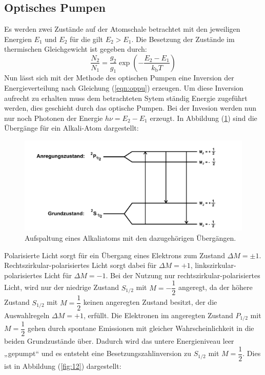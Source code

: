\subsection{Optisches Pumpen}
\label{sec:op}
Es werden zwei Zustände auf der Atomschale betrachtet mit den jeweiligen Energien $E_\mathrm{1}$ und $E_\mathrm{2}$ für die gilt $E_\mathrm{2}>E_\mathrm{1}$. Die Besetzung der Zustände im thermischen Gleichgewicht ist gegeben durch:
\begin{equation}
  \label{eqn:oppu}
  \dfrac{N_\mathrm{2}}{N_\mathrm{1}}=\dfrac{g_\mathrm{2}}{g_\mathrm{1}}\exp(-\dfrac{E_\mathrm{2}-E_\mathrm{1}}{k_\mathrm{b}T})
\end{equation}
Nun lässt sich mit der Methode des optischen Pumpen eine Inversion der Energieverteilung nach Gleichung (\ref{eqn:oppu}) erzeugen. Um diese Inversion aufrecht zu erhalten muss dem betrachteten Sytem ständig Energie zugeführt werden, dies geschieht durch das optische Pumpen. Bei der Invesion werden nun nur noch Photonen der Energie $h\nu=E_\mathrm{2}-E_\mathrm{1}$ erzeugt.
In Abbildung (\ref{fig:niveaus}) sind die Übergänge für ein Alkali-Atom dargestellt:
\begin{figure}[h!]
  \centering
  \includegraphics[scale=0.5]{fig/niveaus.png}
  \caption{Aufspaltung eines Alkaliatoms mit den dazugehörigen Übergängen.}
  \label{fig:niveaus}
\end{figure}
Polarisierte Licht sorgt für ein Übergang eines Elektrons zum Zustand $\Delta M=\pm 1$. Rechtszirkular-polarisiertes Licht sorgt dabei für $\Delta M=+1$, linkszirkular-polarisiertes Licht für $\Delta M=-1$.
Bei der Nutzung nur rechtszirkular-polarisiertes Licht, wird nur der niedrige Zustand $S_\mathrm{1/2}$ mit $M=-\dfrac{1}{2}$ angeregt, da der höhere Zustand $S_\mathrm{1/2}$ mit $M=\dfrac{1}{2}$ keinen angeregten Zustand besitzt,
der die Auswahlregeln  $\Delta M=+1$, erfüllt. Die Elektronen im angeregten Zustand $P_\mathrm{1/2}$ mit $M=\dfrac{1}{2}$ gehen durch spontane Emissionen mit gleicher Wahrscheinlichkeit in die beiden Grundzustände über. Dadurch wird das untere Energieniveau leer „gepumpt“ und es entsteht eine Besetzungszahlinversion zu $S_\mathrm{1/2}$ mit $M=\dfrac{1}{2}$. Dies ist in Abbildung (\ref{fig:12}) dargestellt:
